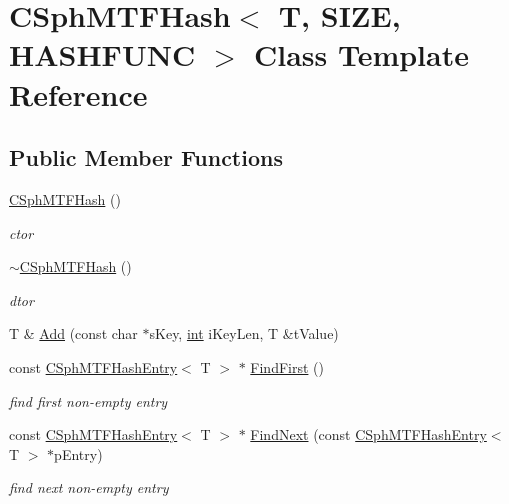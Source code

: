 \hypertarget{classCSphMTFHash}{\section{C\-Sph\-M\-T\-F\-Hash$<$ T, S\-I\-Z\-E, H\-A\-S\-H\-F\-U\-N\-C $>$ Class Template Reference}
\label{classCSphMTFHash}
}
\subsection*{Public Member Functions}
\begin{DoxyCompactItemize}
\item 
\hyperlink{classCSphMTFHash_ad78bf41ec4c9d6836112041c1bc3a9c5}{C\-Sph\-M\-T\-F\-Hash} ()
\begin{DoxyCompactList}\small\item\em ctor \end{DoxyCompactList}\item 
\hyperlink{classCSphMTFHash_a97d50fed540cc53f7caffd0ac70b32f6}{$\sim$\-C\-Sph\-M\-T\-F\-Hash} ()
\begin{DoxyCompactList}\small\item\em dtor \end{DoxyCompactList}\item 
T \& \hyperlink{classCSphMTFHash_a5e1dc7d876c16b395b08d9de9a3e5bb0}{Add} (const char $\ast$s\-Key, \hyperlink{sphinxexpr_8cpp_a4a26e8f9cb8b736e0c4cbf4d16de985e}{int} i\-Key\-Len, T \&t\-Value)
\item 
const \hyperlink{structCSphMTFHashEntry}{C\-Sph\-M\-T\-F\-Hash\-Entry}$<$ T $>$ $\ast$ \hyperlink{classCSphMTFHash_a4c8e0f4e867f593285b8429cfdd94896}{Find\-First} ()
\begin{DoxyCompactList}\small\item\em find first non-\/empty entry \end{DoxyCompactList}\item 
const \hyperlink{structCSphMTFHashEntry}{C\-Sph\-M\-T\-F\-Hash\-Entry}$<$ T $>$ $\ast$ \hyperlink{classCSphMTFHash_a921fc7c8f69f7b9fce9b29d6be6cf782}{Find\-Next} (const \hyperlink{structCSphMTFHashEntry}{C\-Sph\-M\-T\-F\-Hash\-Entry}$<$ T $>$ $\ast$p\-Entry)
\begin{DoxyCompactList}\small\item\em find next non-\/empty entry \end{DoxyCompactList}\end{DoxyCompactItemize}
